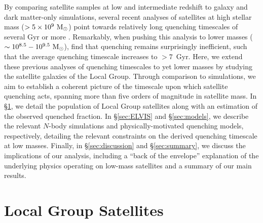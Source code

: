 \documentclass[usenatbib]{mn2e}
\newcommand{\msun}{{\rm M}_{\odot}}
\begin{document}
By comparing satellite samples at low and intermediate redshift to
galaxy and dark matter-only simulations, several recent analyses of
satellites at high stellar mass ($> 5 \times 10^{9}~\msun$) point
towards relatively long quenching timescales of several Gyr or more
\citep{wetzel13, delucia12}. 
%
Remarkably, when pushing this analysis to lower masses ($\sim 10^{8.5}
- 10^{9.5}~\msun$), \citet{wheeler14} find that quenching remains
surprisingly inefficient, such that the average quenching timescale
increases to $> 7$~Gyr. Here, we extend these previous analyses of
quenching timescales to yet lower masses by studying the satellite
galaxies of the Local Group. Through comparison to simulations, we aim
to establish a coherent picture of the timescale upon which satellite
quenching acts, spanning more than five orders of magnitude in
satellite mass. In \S\ref{sec:LG}, we detail the population of Local
Group satellites along with an estimation of the observed quenched
fraction. In \S\ref{sec:ELVIS} and \S\ref{sec:models}, we describe the
relevant $N$-body simulations and physically-motivated quenching
models, respectively, detailing the relevant constraints on the
derived quenching timescale at low masses. Finally, in
\S\ref{sec:discussion} and \S\ref{sec:summary}, we discuss the
implications of our analysis, including a ``back of the envelope''
explanation of the underlying physics operating on low-mass satellites
and a summary of our main results.


\section{Local Group Satellites}
\label{sec:LG}
\end{document}
